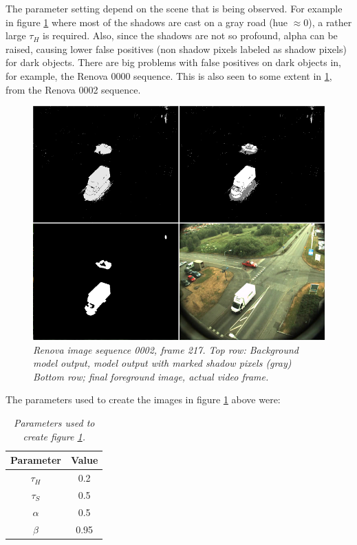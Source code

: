 The parameter setting depend on the scene that is being observed. For example in figure \ref{fig:shadow_suppression_fig} where most of the shadows are cast on a gray road (hue $\approx 0$), a rather large $\tau_H$ is required. Also, since the shadows are not so profound, alpha can be raised, causing lower false positives (non shadow pixels labeled as shadow pixels) for dark objects. There are big problems with false positives on dark objects in, for example, the Renova 0000 sequence. This is also seen to some extent in \ref{fig:shadow_suppression_fig}, from the Renova 0002 sequence.

\newpage
\begin{figure}[htb]
	\centering
	\includegraphics[width=\linewidth]{images/ShadowRenova0002.png}
	\caption{\textit{Renova image sequence 0002, frame 217. 
	\newline
	Top row: Background model output, model output with marked shadow pixels (gray) \newline
	Bottom row; final foreground image, actual video frame.}}
	\label{fig:shadow_suppression_fig}  %
\end{figure}

The parameters used to create the images in figure \ref{fig:shadow_suppression_fig} above were:

\begin{table}[htb]
\centering
\begin{tabular}{|c|c|}
	\hline
	Parameter & Value  \\
	\hline
	$\tau_H$ &  0.2 \\
	\hline
	$\tau_S$ & 0.5 \\
	\hline
	$\alpha$ &  0.5 \\
	\hline
	$\beta$ &  0.95 \\
	\hline
\end{tabular}

\caption{\textit{Parameters used to create figure \ref{fig:shadow_suppression_fig}.}}
\label{tab:shadow_parameters}
\end{table}